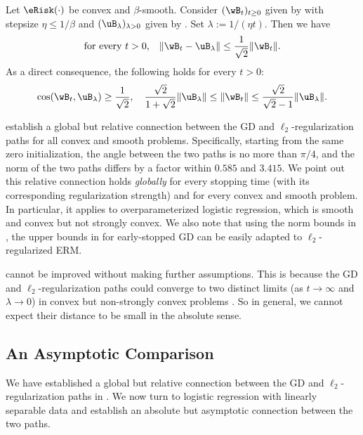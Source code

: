 \documentclass[11pt]{article}
\begin{document}
\begin{theorem}\label{thm:path:global-angle}
Let $\eRisk(\cdot)$ be convex and $\beta$-smooth. Consider $(\wB_t)_{t\ge 0}$ given by  with stepsize $\eta \le 1/\beta$ and $(\uB_\lambda)_{\lambda > 0}$ given by . 
Set $\lambda := 1/(\eta t)$. Then we have 
\begin{align*}
\text{for every $t>0$,} \quad   \|\wB_t - \uB_\lambda \|\le \frac{1}{\sqrt{2}}\|\wB_t\|.
\end{align*}
As a direct consequence, the following holds for every $t>0$: 
\begin{gather*}
\cos(\wB_t, \uB_\lambda) \ge \frac{1}{\sqrt{2}},\quad
    \frac{\sqrt{2}}{1+\sqrt{2}} \|\uB_\lambda\| \le \|\wB_t\| \le \frac{\sqrt{2}}{\sqrt{2}-1}\|\uB_\lambda\|.
\end{gather*}
\end{theorem}

 establish a global but relative connection between the GD and $\ell_2$-regularization paths for all convex and smooth problems. Specifically, starting from the same zero initialization, the angle between the two paths is no more than $\pi/4$, and the norm of the two paths differs by a factor within $0.585$ and $3.415$. We point out this relative connection holds \emph{globally} for every stopping time (with its corresponding regularization strength) and for every convex and smooth problem.
In particular, it applies to overparameterized logistic regression, which is smooth and convex but not strongly convex. We also note that using the norm bounds in , the upper bounds in  for early-stopped GD can be easily adapted to $\ell_2$-regularized ERM. 

 cannot be improved without making further assumptions. This is because the GD and $\ell_2$-regularization paths could converge to two distinct limits (as $t\to\infty$ and $\lambda\to 0$) in convex but non-strongly convex problems \citep[see][Section 4]{suggala2018connecting}. 
So in general, we cannot expect their distance to be small in the absolute sense.

\subsection{An Asymptotic Comparison}
We have established a global but relative connection between the GD and $\ell_2$-regularization paths in . We now turn to logistic regression with linearly separable data and establish an absolute but asymptotic connection between the two paths. 
\end{document}
